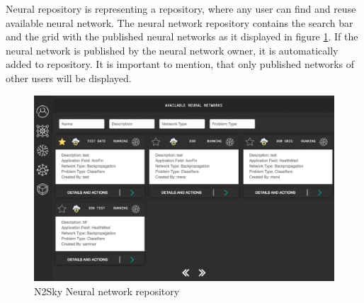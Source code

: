 Neural repository is representing a repository, where any user can find and reuse available neural network. The neural network repository contains the search bar and the grid with the published neural networks as it displayed in figure \ref{fig:nn_repository}. If the neural network is published by the neural network owner, it is automatically added to repository. It is important to mention, that only published networks of other users will be displayed. 

\begin{figure}[htbp]
\begin{center}
  \includegraphics[width=\linewidth]{components/5/img/nn_repository.png}
  \caption{N2Sky Neural network repository}
  \label{fig:nn_repository}
\end{center}
\end{figure}


